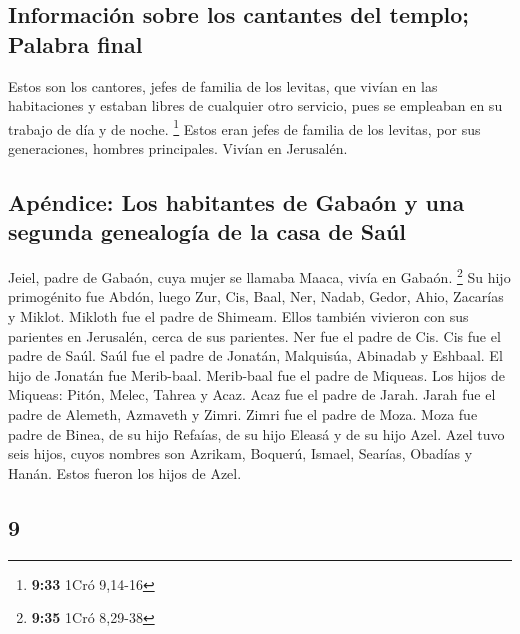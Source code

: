 \begin{paracol}{2}
\hypertarget{informaciuxf3n-sobre-los-cantantes-del-templo-palabra-final}{%
\subsection{Información sobre los cantantes del templo; Palabra
final}\label{informaciuxf3n-sobre-los-cantantes-del-templo-palabra-final}}

 Estos son los cantores, jefes de familia de los levitas,
que vivían en las habitaciones y estaban libres de cualquier otro
servicio, pues se empleaban en su trabajo de día y de noche. \footnote{\textbf{9:33}
  1Cró 9,14-16}  Estos eran jefes de familia de los
levitas, por sus generaciones, hombres principales. Vivían en Jerusalén.

\hypertarget{apuxe9ndice-los-habitantes-de-gabauxf3n-y-una-segunda-genealoguxeda-de-la-casa-de-sauxfal}{%
\subsection{Apéndice: Los habitantes de Gabaón y una segunda genealogía
de la casa de
Saúl}\label{apuxe9ndice-los-habitantes-de-gabauxf3n-y-una-segunda-genealoguxeda-de-la-casa-de-sauxfal}}

 Jeiel, padre de Gabaón, cuya mujer se llamaba Maaca,
vivía en Gabaón. \footnote{\textbf{9:35} 1Cró 8,29-38} 
Su hijo primogénito fue Abdón, luego Zur, Cis, Baal, Ner, Nadab,
 Gedor, Ahio, Zacarías y Miklot.  Mikloth
fue el padre de Shimeam. Ellos también vivieron con sus parientes en
Jerusalén, cerca de sus parientes.  Ner fue el padre de
Cis. Cis fue el padre de Saúl. Saúl fue el padre de Jonatán, Malquisúa,
Abinadab y Eshbaal.  El hijo de Jonatán fue Merib-baal.
Merib-baal fue el padre de Miqueas.  Los hijos de
Miqueas: Pitón, Melec, Tahrea y Acaz.  Acaz fue el padre
de Jarah. Jarah fue el padre de Alemeth, Azmaveth y Zimri. Zimri fue el
padre de Moza.  Moza fue padre de Binea, de su hijo
Refaías, de su hijo Eleasá y de su hijo Azel.  Azel tuvo
seis hijos, cuyos nombres son Azrikam, Boquerú, Ismael, Searías, Obadías
y Hanán. Estos fueron los hijos de Azel.

\switchcolumn
\begin{otherlanguage}{english}

\hypertarget{section-17}{%
\section{9}\label{section-17}}


\end{otherlanguage}
\end{paracol}
